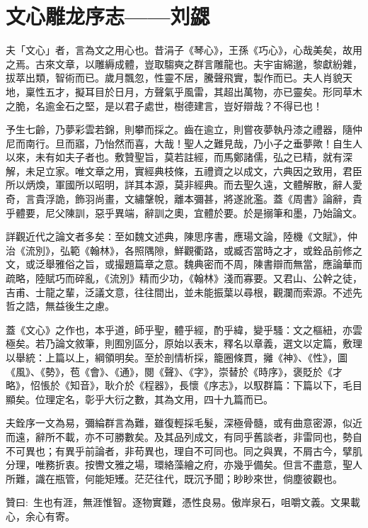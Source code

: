 \section{文心雕龙序志——刘勰}

夫「文心」者，言為文之用心也。昔涓子《琴心》，王孫《巧心》，心哉美矣，故用之焉。古來文章，以雕縟成體，豈取騶奭之群言雕龍也。夫宇宙綿邈，黎獻紛雜，拔萃出類，智術而已。歲月飄忽，性靈不居，騰聲飛實，製作而已。夫人肖貌天地，稟性五才，擬耳目於日月，方聲氣乎風雷，其超出萬物，亦已靈矣。形同草木之脆，名逾金石之堅，是以君子處世，樹德建言，豈好辯哉？不得已也！

予生七齡，乃夢彩雲若錦，則攀而採之。齒在逾立，則嘗夜夢執丹漆之禮器，隨仲尼而南行。旦而寤，乃怡然而喜，大哉！聖人之難見哉，乃小子之垂夢歟！自生人以來，未有如夫子者也。敷贊聖旨，莫若註經，而馬鄭諸儒，弘之已精，就有深解，未足立家。唯文章之用，實經典枝條，五禮資之以成文，六典因之致用，君臣所以炳煥，軍國所以昭明，詳其本源，莫非經典。而去聖久遠，文體解散，辭人愛奇，言貴浮詭，飾羽尚畫，文繡鞶帨，離本彌甚，將遂訛濫。蓋《周書》論辭，貴乎體要，尼父陳訓，惡乎異端，辭訓之奧，宜體於要。於是搦筆和墨，乃始論文。

詳觀近代之論文者多矣∶至如魏文述典，陳思序書，應瑒文論，陸機《文賦》，仲治《流別》，弘範《翰林》，各照隅隙，鮮觀衢路，或臧否當時之才，或銓品前修之文，或泛舉雅俗之旨，或撮題篇章之意。魏典密而不周，陳書辯而無當，應論華而疏略，陸賦巧而碎亂，《流別》精而少功，《翰林》淺而寡要。又君山、公幹之徒，吉甫、士龍之輩，泛議文意，往往間出，並未能振葉以尋根，觀瀾而索源。不述先哲之誥，無益後生之慮。

蓋《文心》之作也，本乎道，師乎聖，體乎經，酌乎緯，變乎騷：文之樞紐，亦雲極矣。若乃論文敘筆，則囿別區分，原始以表末，釋名以章義，選文以定篇，敷理以舉統：上篇以上，綱領明矣。至於剖情析採，籠圈條貫，攡《神》、《性》，圖《風》、《勢》，苞《會》、《通》，閱《聲》、《字》，崇替於《時序》，褒貶於《才略》，怊悵於《知音》，耿介於《程器》，長懷《序志》，以馭群篇：下篇以下，毛目顯矣。位理定名，彰乎大衍之數，其為文用，四十九篇而已。

夫銓序一文為易，彌綸群言為難，雖復輕採毛髮，深極骨髓，或有曲意密源，似近而遠，辭所不載，亦不可勝數矣。及其品列成文，有同乎舊談者，非雷同也，勢自不可異也；有異乎前論者，非苟異也，理自不可同也。同之與異，不屑古今，擘肌分理，唯務折衷。按轡文雅之場，環絡藻繪之府，亦幾乎備矣。但言不盡意，聖人所難，識在瓶管，何能矩矱。茫茫往代，既沉予聞；眇眇來世，倘塵彼觀也。

贊曰$\colon$ 生也有涯，無涯惟智。逐物實難，憑性良易。傲岸泉石，咀嚼文義。文果載心，余心有寄。

